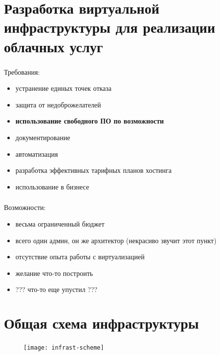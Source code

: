 
\frame[plain]{\titlepage} %


\section{Разработка виртуальной инфраструктуры для реализации облачных услуг}

\begin{frame}
\frametitle{\insertsection}
Требования:
\begin{itemize}
	\item устранение единых точек отказа %
	\item защита от недоброжелателей %
	\item \textbf{использование свободного ПО по возможности}
	\item документирование
	\item автоматизация
	\item разработка эффективных тарифных планов хостинга
	\item использование в бизнесе
\end{itemize}
\end{frame}

\begin{frame}
\frametitle{\insertsection}
Возможности:
\begin{itemize}
	\item весьма ограниченный бюджет
	\item всего один админ, он же архитектор (некрасиво звучит этот пункт)
	\item отсутствие опыта работы с виртуализацией
	\item желание что-то построить
	\item ??? что-то еще упустил ???
\end{itemize}
\end{frame}


\section{Общая схема инфраструктуры}

\begin{frame}
\frametitle{\insertsection}
\begin{figure}[h]
	\begin{center}
		\texttt{[image: infrast-scheme]}
	 \end{center}
\end{figure}
\end{frame}

